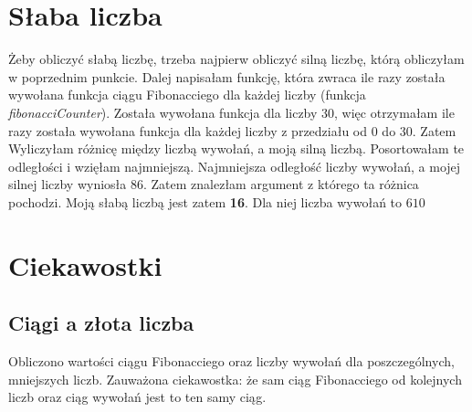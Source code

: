 \documentclass[12pt,a4paper]{article}
\begin{document}
\newpage
\section{Słaba liczba}


Żeby obliczyć słabą liczbę, trzeba najpierw obliczyć silną liczbę, którą obliczyłam w poprzednim punkcie. Dalej napisałam funkcję, która zwraca ile razy została wywołana funkcja ciągu Fibonacciego dla każdej liczby (funkcja \textit{fibonacciCounter}). Została wywołana funkcja dla liczby 30, więc otrzymałam ile razy została wywołana funkcja dla każdej liczby z przedziału od 0 do 30. Zatem Wyliczyłam różnicę między liczbą wywołań, a moją silną liczbą. Posortowałam te odległości i wzięłam najmniejszą. Najmniejsza odległość liczby wywołań, a mojej silnej liczby wyniosła $86$. Zatem znalezłam argument z którego ta różnica pochodzi. Moją słabą liczbą jest zatem \textbf{16}. Dla niej liczba wywołań to $610$

\newpage
\section{Ciekawostki}

\subsection{Ciągi a złota liczba}
Obliczono wartości ciągu Fibonacciego oraz liczby wywołań dla poszczególnych, mniejszych liczb. Zauważona ciekawostka: że sam ciąg Fibonacciego od kolejnych liczb oraz ciąg wywołań jest to ten samy ciąg. 
\end{document}
